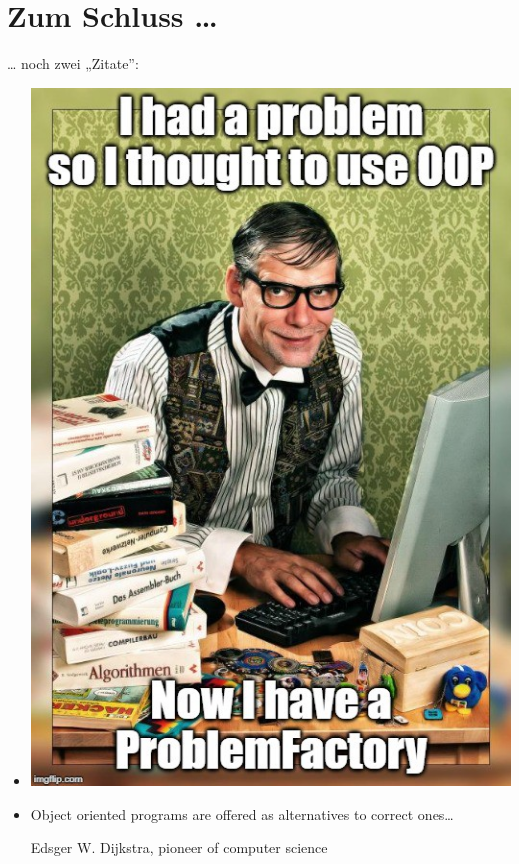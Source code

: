 \documentclass[11pt]{article}
\begin{document}
\section*{Zum Schluss \ldots{}}
\label{sec:org04c2325}
\ldots{} noch zwei „Zitate”: 
\begin{itemize}
\item \begin{center}
\includegraphics[width=.9\linewidth]{./problemfactory.jpeg}
\end{center}
\item Object oriented programs are offered as alternatives to correct ones…

Edsger W. Dijkstra, pioneer of computer science
\end{itemize}
\end{document}
